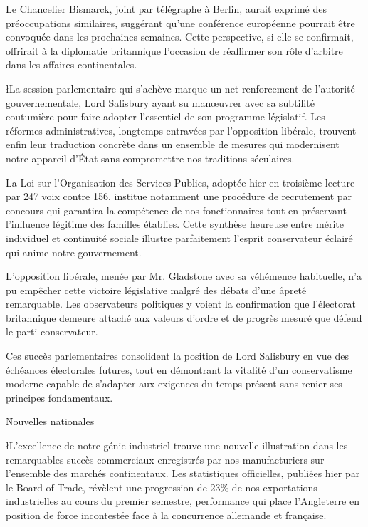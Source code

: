 \documentclass{news}
\begin{document}
Le Chancelier Bismarck, joint par télégraphe à Berlin, aurait exprimé des préoccupations similaires, suggérant qu'une conférence européenne pourrait être convoquée dans les prochaines semaines. Cette perspective, si elle se confirmait, offrirait à la diplomatie britannique l'occasion de réaffirmer son rôle d'arbitre dans les affaires continentales.

\l{L}a session parlementaire qui s'achève marque un net renforcement de l'autorité gouvernementale, Lord Salisbury ayant su manœuvrer avec sa subtilité coutumière pour faire adopter l'essentiel de son programme législatif. Les réformes administratives, longtemps entravées par l'opposition libérale, trouvent enfin leur traduction concrète dans un ensemble de mesures qui modernisent notre appareil d'État sans compromettre nos traditions séculaires.

La Loi sur l'Organisation des Services Publics, adoptée hier en troisième lecture par 247 voix contre 156, institue notamment une procédure de recrutement par concours qui garantira la compétence de nos fonctionnaires tout en préservant l'influence légitime des familles établies. Cette synthèse heureuse entre mérite individuel et continuité sociale illustre parfaitement l'esprit conservateur éclairé qui anime notre gouvernement.

L'opposition libérale, menée par Mr. Gladstone avec sa véhémence habituelle, n'a pu empêcher cette victoire législative malgré des débats d'une âpreté remarquable. Les observateurs politiques y voient la confirmation que l'électorat britannique demeure attaché aux valeurs d'ordre et de progrès mesuré que défend le parti conservateur.

Ces succès parlementaires consolident la position de Lord Salisbury en vue des échéances électorales futures, tout en démontrant la vitalité d'un conservatisme moderne capable de s'adapter aux exigences du temps présent sans renier ses principes fondamentaux.

\h{Nouvelles nationales}

\l{L}'excellence de notre génie industriel trouve une nouvelle illustration dans les remarquables succès commerciaux enregistrés par nos manufacturiers sur l'ensemble des marchés continentaux. Les statistiques officielles, publiées hier par le Board of Trade, révèlent une progression de 23\% de nos exportations industrielles au cours du premier semestre, performance qui place l'Angleterre en position de force incontestée face à la concurrence allemande et française.
\end{document}

